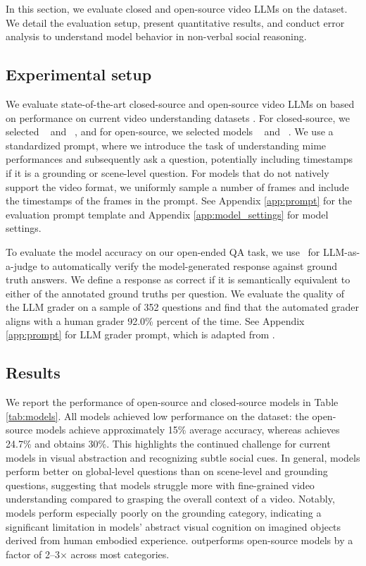 In this section, we evaluate closed and open-source video LLMs on the {\data} dataset. We detail the evaluation setup, present quantitative results, and conduct error analysis to understand model behavior in non-verbal social reasoning.

\subsection{Experimental setup}

We evaluate state-of-the-art closed-source and open-source video LLMs on {\data} based on performance on current video understanding datasets \cite{fu2024video, wu2025longvideobench}. For closed-source, we selected \gemini~\citep{team2024gemini}  and \gpt~\citep{achiam2023gpt}, and for open-source, we selected models \qwen~\citep{qwen2.5-VL} and \llava~\citep{zhangVideoInstructionTuning2024}. We use a standardized prompt, where we introduce the task of understanding mime performances and subsequently ask a question, potentially including timestamps if it is a grounding or scene-level question. For models that do not natively support the video format, we uniformly sample a number of frames and include the timestamps of the frames in the prompt. See Appendix \ref{app:prompt} for the evaluation prompt template and Appendix \ref{app:model_settings} for model settings.

To evaluate the model accuracy on our open-ended QA task, we use \gpt~for LLM-as-a-judge \cite{zheng2023judging} to automatically verify the model-generated response against ground truth answers. We define a response as correct if it is semantically equivalent to either of the annotated ground truths per question. We evaluate the quality of the LLM grader on a sample of 352 questions and find that the automated grader aligns with a human grader 92.0\% percent of the time. 
See Appendix \ref{app:prompt} for LLM grader prompt, which is adapted from \citet{nagrani2024neptune}.

\subsection{Results}

We report the performance of open-source and closed-source models in Table \ref{tab:models}. All models achieved low performance on the dataset: the open-source models achieve approximately 15\% average accuracy, whereas {\gpt} achieves 24.7\% and {\gemini} obtains 30\%. This highlights the continued challenge for current models in visual abstraction and recognizing subtle social cues. In general, models perform better on global-level questions than on scene-level and grounding questions, suggesting that models struggle more with fine-grained video understanding compared to grasping the overall context of a video. Notably, models perform especially poorly on the grounding category, indicating a significant limitation in models' abstract visual cognition on imagined objects derived from human embodied experience. {\gemini} outperforms open-source models by a factor of 2–3$\times$ across most categories.

